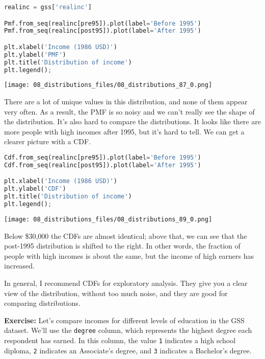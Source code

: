 \begin{lstlisting}[language=Python,style=source]
realinc = gss['realinc']

Pmf.from_seq(realinc[pre95]).plot(label='Before 1995')
Pmf.from_seq(realinc[post95]).plot(label='After 1995')

plt.xlabel('Income (1986 USD)')
plt.ylabel('PMF')
plt.title('Distribution of income')
plt.legend();
\end{lstlisting}

\begin{center}
\texttt{[image: 08\_distributions\_files/08\_distributions\_87\_0.png]}
\end{center}

There are a lot of unique values in this distribution, and none of them
appear very often. As a result, the PMF is so noisy and we can't really
see the shape of the distribution. It's also hard to compare the
distributions. It looks like there are more people with high incomes
after 1995, but it's hard to tell. We can get a clearer picture with a
CDF.

\begin{lstlisting}[language=Python,style=source]
Cdf.from_seq(realinc[pre95]).plot(label='Before 1995')
Cdf.from_seq(realinc[post95]).plot(label='After 1995')

plt.xlabel('Income (1986 USD)')
plt.ylabel('CDF')
plt.title('Distribution of income')
plt.legend();
\end{lstlisting}

\begin{center}
\texttt{[image: 08\_distributions\_files/08\_distributions\_89\_0.png]}
\end{center}

Below \$30,000 the CDFs are almost identical; above that, we can see
that the post-1995 distribution is shifted to the right. In other words,
the fraction of people with high incomes is about the same, but the
income of high earners has increased.

In general, I recommend CDFs for exploratory analysis. They give you a
clear view of the distribution, without too much noise, and they are
good for comparing distributions.

\textbf{Exercise:} Let's compare incomes for different levels of
education in the GSS dataset. We'll use the
\passthrough{\lstinline!degree!} column, which represents the highest
degree each respondent has earned. In this column, the value
\passthrough{\lstinline!1!} indicates a high school diploma,
\passthrough{\lstinline!2!} indicates an Associate's degree, and
\passthrough{\lstinline!3!} indicates a Bachelor's degree.

